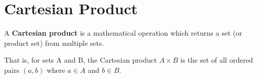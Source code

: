 
\section{Cartesian Product}
 A \textbf{Cartesian product} is a mathematical operation which returns a set (or product set) from multiple sets. 
 
 That is, for sets A and B, the Cartesian product $A \times B$ is the set of all ordered pairs $(a, b)$ where $a \in A$ and $b \in B$.


